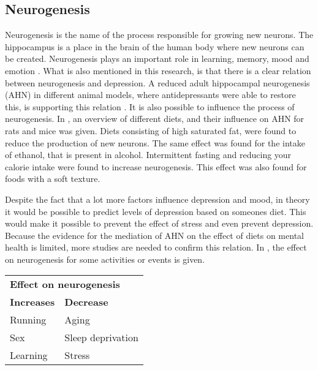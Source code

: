 \subsection{Neurogenesis} \label{subsection: Neurogenesis}
Neurogenesis is the name of the process responsible for growing new neurons.
The hippocampus is a place in the brain of the human body where new neurons can be created.
Neurogenesis plays an important role in learning, memory, mood and emotion \cite{smithimpact}.
What is also mentioned in this research, is that there is a clear relation between neurogenesis and depression.
A reduced adult hippocampal neurogenesis (AHN) in different animal models, where antidepressants were able to restore this, is supporting this relation \cite{malberg2003cell, dranovsky2006hippocampal}.
It is also possible to influence the process of neurogenesis. 
In \cite{stangl2009impact}, an overview of different diets, and their influence on AHN for rats and mice was given.
Diets consisting of high saturated fat, were found to reduce the production of new neurons. The same effect was found for the intake of ethanol, that is present in alcohol.
Intermittent fasting and reducing your calorie intake were found to increase neurogenesis.
This effect was also found for foods with a soft texture.

Despite the fact that a lot more factors influence depression and mood, in theory it would be possible to predict levels of depression based on someones diet.
This would make it possible to prevent the effect of stress and even prevent depression.
Because the evidence for the mediation of AHN on the effect of diets on mental health is limited, more studies are needed to confirm this relation. 
In , the effect on neurogenesis for some activities or events is given.
%
\begin{table}
	\centering
	\begin{tabular}{@{}ll@{}}
		\toprule
		\multicolumn{2}{l}{\textbf{Effect on neurogenesis}} \\
		\cline{0-1}
		\textbf{Increases} & \textbf{Decrease}  \\ \midrule
		Running & Aging\\
		Sex & Sleep deprivation\\
		Learning & Stress \\ \bottomrule
	\end{tabular}
	\label{table:effectsneurogenesis}
\end{table}
%